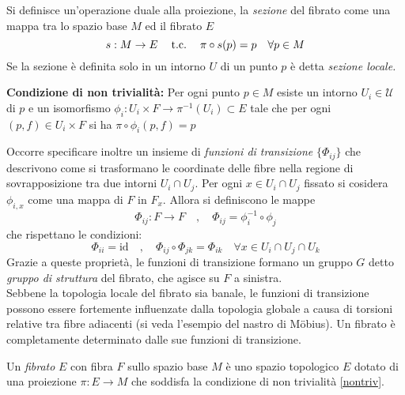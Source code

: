 Si definisce un'operazione duale alla proiezione, la \emph{sezione} del fibrato
come una mappa tra lo spazio base $M$ ed il fibrato $E$
\begin{equation}\label{def:section}
   s : M \to E \quad \mathrm{\: t.c. \:} \quad \pi \circ s (p) = p \quad \forall p \in M
\end{equation}
Se la sezione è definita solo in un intorno $U$ di un punto $p$ è detta \emph{sezione locale.}


\begin{axiom}\textbf{Condizione di non trivialità:} \label{nontriv}
      Per ogni punto $p \in M$ esiste un intorno $U_i \in \mathcal{U}$ di $p$ e un isomorfismo
      $\phi_i : U_i \times F \to \pi^{-1}(U_i) \subset E$ tale che per ogni
      $(p,f) \in U_i \times F$ si ha $\pi \circ \phi_i(p,f) = p$
\end{axiom}

Occorre specificare inoltre un insieme di \emph{funzioni di transizione} $\{\Phi_{ij}\}$ che
descrivono come si trasformano le coordinate delle fibre nella regione di
sovrapposizione tra due intorni $U_i \cap U_j$. Per ogni $x \in U_i \cap U_j$ fissato si
cosidera $\phi_{i,x}$ come una mappa di $F$ in $F_x$.
Allora si definiscono le mappe
\begin{equation}\label{eq:transfunctions}
   \Phi_{ij} : F \to F \quad , \quad \Phi_{ij} = \phi_i^{-1} \circ\phi_j
\end{equation}
che rispettano le condizioni:
\begin{equation}
   \Phi_{ii} = \mathrm{id} \quad , \quad \Phi_{ij} \circ \Phi_{jk} = \Phi_{ik}
   \quad \forall x \in U_i \cap U_j \cap U_k
\end{equation}
Grazie a queste proprietà, le funzioni di transizione formano un gruppo $G$ detto
\emph{gruppo di struttura} del fibrato, che agisce su $F$ a sinistra.\\

Sebbene la topologia locale del fibrato sia banale, le funzioni di transizione
possono essere fortemente influenzate dalla topologia globale a causa di torsioni
relative tra fibre adiacenti (si veda l'esempio del nastro di Möbius). Un fibrato
è completamente determinato dalle sue funzioni di transizione.\\

\begin{definition}
   Un \emph{fibrato} $E$ con fibra $F$ sullo spazio base $M$ è uno spazio topologico
   $E$ dotato di una proiezione $\pi : E \to M$ che soddisfa la condizione di
   non trivialità \ref{nontriv}.
\end{definition}

